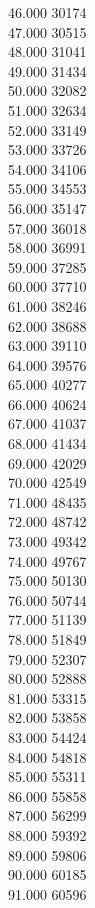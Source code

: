 { 46.000	30174 \\
 47.000	30515 \\
 48.000	31041 \\
 49.000	31434 \\
 50.000	32082 \\
 51.000	32634 \\
 52.000	33149 \\
 53.000	33726 \\
 54.000	34106 \\
 55.000	34553 \\
 56.000	35147 \\
 57.000	36018 \\
 58.000	36991 \\
 59.000	37285 \\
 60.000	37710 \\
 61.000	38246 \\
 62.000	38688 \\
 63.000	39110 \\
 64.000	39576 \\
 65.000	40277 \\
 66.000	40624 \\
 67.000	41037 \\
 68.000	41434 \\
 69.000	42029 \\
 70.000	42549 \\
 71.000	48435 \\
 72.000	48742 \\
 73.000	49342 \\
 74.000	49767 \\
 75.000	50130 \\
 76.000	50744 \\
 77.000	51139 \\
 78.000	51849 \\
 79.000	52307 \\
 80.000	52888 \\
 81.000	53315 \\
 82.000	53858 \\
 83.000	54424 \\
 84.000	54818 \\
 85.000	55311 \\
 86.000	55858 \\
 87.000	56299 \\
 88.000	59392 \\
 89.000	59806 \\
 90.000	60185 \\
 91.000	60596 \\
}
